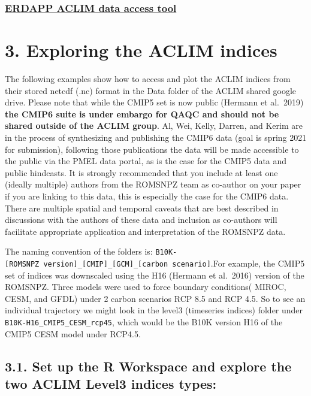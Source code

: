 \documentclass[
]{article}
\begin{document}
\hypertarget{erdapp-aclim-data-access-tool}{%
\subsubsection{\texorpdfstring{\href{https://data.pmel.noaa.gov/aclim/erddap/}{ERDAPP
ACLIM data access
tool}}{ERDAPP ACLIM data access tool}}\label{erdapp-aclim-data-access-tool}}

\hypertarget{exploring-the-aclim-indices}{%
\section{3. Exploring the ACLIM
indices}\label{exploring-the-aclim-indices}}

The following examples show how to access and plot the ACLIM indices
from their stored netcdf (.nc) format in the Data folder of the ACLIM
shared google drive. Please note that while the CMIP5 set is now public
(Hermann et al.~2019) \textbf{the CMIP6 suite is under embargo for QAQC
and should not be shared outside of the ACLIM group}. Al, Wei, Kelly,
Darren, and Kerim are in the process of synthesizing and publishing the
CMIP6 data (goal is spring 2021 for submission), following those
publications the data will be made accessible to the public via the PMEL
data portal, as is the case for the CMIP5 data and public hindcasts. It
is strongly recommended that you include at least one (ideally multiple)
authors from the ROMSNPZ team as co-author on your paper if you are
linking to this data, this is especially the case for the CMIP6 data.
There are multiple spatial and temporal caveats that are best described
in discussions with the authors of these data and inclusion as
co-authors will facilitate appropriate application and interpretation of
the ROMSNPZ data.

The naming convention of the folders is:
\texttt{B10K-{[}ROMSNPZ\ version{]}\_{[}CMIP{]}\_{[}GCM{]}\_{[}carbon\ scenario{]}}.For
example, the CMIP5 set of indices was downscaled using the H16 (Hermann
et al.~2016) version of the ROMSNPZ. Three models were used to force
boundary conditions( MIROC, CESM, and GFDL) under 2 carbon scenarios RCP
8.5 and RCP 4.5. So to see an individual trajectory we might look in the
level3 (timeseries indices) folder under
\texttt{B10K-H16\_CMIP5\_CESM\_rcp45}, which would be the B10K version
H16 of the CMIP5 CESM model under RCP4.5.

\hypertarget{set-up-the-r-workspace-and-explore-the-two-aclim-level3-indices-types}{%
\subsection{3.1. Set up the R Workspace and explore the two ACLIM Level3
indices
types:}\label{set-up-the-r-workspace-and-explore-the-two-aclim-level3-indices-types}}
\end{document}
